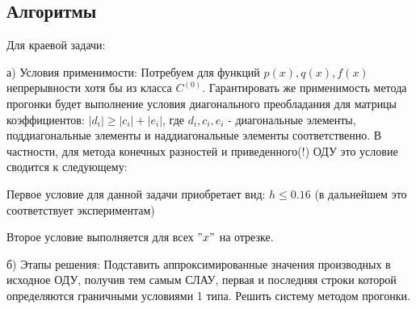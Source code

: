 \documentclass{article}
\begin{document}
	\subsection{Алгоритмы}
	Для краевой задачи:
	
	а) Условия применимости: Потребуем для функций $p(x), q(x), f(x)$ непрерывности хотя бы из класса $C^{(0)}$. Гарантировать же применимость метода прогонки будет выполнение условия диагонального преобладания для матрицы коэффициентов: $|d_i| \geq |c_i| + |e_i|$, где $d_i, c_i, e_i$ - диагональные элементы, поддиагональные элементы и наддиагональные элементы соответственно. В частности, для метода конечных разностей и приведенного(!) ОДУ это условие сводится к следующему: 
	

	
	Первое условие для данной задачи приобретает вид: $h \leq 0.16$ (в дальнейшем это соответствует экспериментам)\par
	Второе условие выполняется для всех $"x"$ на отрезке.
	
	б) Этапы решения: Подставить аппроксимированные значения производных в исходное ОДУ, получив тем самым СЛАУ, первая и последняя строки которой определяются граничными условиями 1 типа. Решить систему методом прогонки. \par
	
\end{document}
